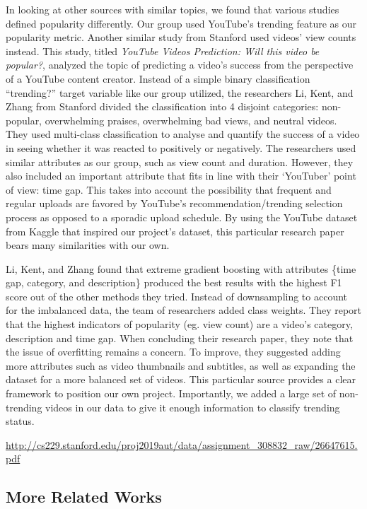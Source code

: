 \documentclass{article}
\begin{document}
\quad In looking at other sources with similar topics, we found that various studies defined popularity differently. Our group used YouTube’s trending feature as our popularity metric. Another similar study from Stanford used videos’ view counts instead. This study, titled \textit{YouTube Videos Prediction: Will this video be popular?}, analyzed the topic of predicting a video’s success from the perspective of a YouTube content creator. Instead of a simple binary classification “trending?” target variable like our group utilized, the researchers Li, Kent, and Zhang from Stanford divided the classification into 4 disjoint categories: non-popular, overwhelming praises, overwhelming bad views, and neutral videos. They used multi-class classification to analyse and quantify the success of a video in seeing whether it was reacted to positively or negatively. The researchers used similar attributes as our group, such as view count and duration. However, they also included an important attribute that fits in line with their ‘YouTuber’ point of view: time gap. This takes into account the possibility that frequent and regular uploads are favored by YouTube’s recommendation/trending selection process as opposed to a sporadic upload schedule. By using the YouTube dataset from Kaggle that inspired our project’s dataset, this particular research paper bears many similarities with our own.
\par Li, Kent, and Zhang found that extreme gradient boosting with attributes \{time gap, category, and description\} produced the best results with the highest F1 score out of the other methods they tried. Instead of downsampling to account for the imbalanced data, the team of researchers added class weights. They report that the highest indicators of popularity (eg. view count) are a video’s category, description and time gap. When concluding their research paper, they note that the issue of overfitting remains a concern. To improve, they suggested adding more attributes such as video thumbnails and subtitles, as well as expanding the dataset for a more balanced set of videos. This particular source provides a clear framework to position our own project. Importantly, we added a large set of non-trending videos in our data to give it enough information to classify trending status. \smallskip

\href{http://cs229.stanford.edu/proj2019aut/data/assignment_308832_raw/26647615.pdf}{http://cs229.stanford.edu/proj2019aut/data/assignment\_308832\_raw/26647615.pdf}

\subsection*{More Related Works}
\end{document}
